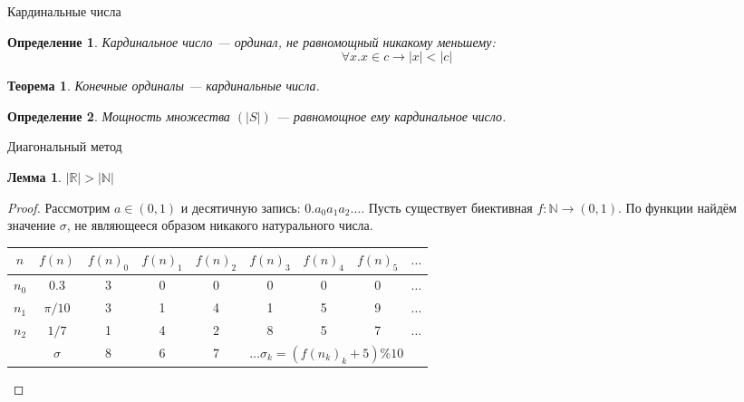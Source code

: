 \documentclass[aspectratio=169]{beamer}
\newtheorem{thm}{Теорема}[section]
\newtheorem{dfn}{Определение}[section]
\newtheorem{lmm}{Лемма}[section]
\begin{document}
\begin{frame}{Кардинальные числа}
\begin{dfn}Кардинальное число --- ординал, не равномощный никакому меньшему:
$$\forall x.x \in c \rightarrow |x| < |c|$$\end{dfn}
\begin{thm}Конечные ординалы --- кардинальные числа.\end{thm}
\begin{dfn}Мощность множества $(|S|)$ --- равномощное ему кардинальное число.\end{dfn}
\end{frame}

\begin{frame}{Диагональный метод}
\begin{lmm}$|\mathbb{R}| > |\mathbb{N}|$\end{lmm}
\begin{proof}Рассмотрим $a \in (0,1)$ и десятичную запись: $0.a_0a_1a_2\dots$.
Пусть существует биективная $f: \mathbb{N}\rightarrow (0,1)$.
По функции найдём значение $\sigma$, не являющееся образом никакого натурального числа.

\begin{center}\begin{tabular}{cc|ccccccl}
 $n$ &  $f(n)$ & $f(n)_0$ & $f(n)_1$ & $f(n)_2$ & $f(n)_3$ & $f(n)_4$ & $f(n)_5$ & $\dots$ \\\hline
 $n_0$ &  0.3  &  \color{red}3    & 0    &  0  &  0  &  0  &  0 & $\dots$ \\
 $n_1$ & $\pi/10$ &  3  & \color{red}1    &  4  &  1  &  5  &  9 & $\dots$ \\
 $n_2$ & $1/7$   & 1 &   4    &  \color{red}2  &  8  &  5  &  7 & $\dots$ \\\hline\pause
       & $\sigma$ & 8 &  6 &        7 &   \multicolumn{4}{l}{$\dots \sigma_k = (f(n_k)_k+5) \% 10$}
\end{tabular}\end{center}

\end{proof}
\end{frame}
\end{document}
